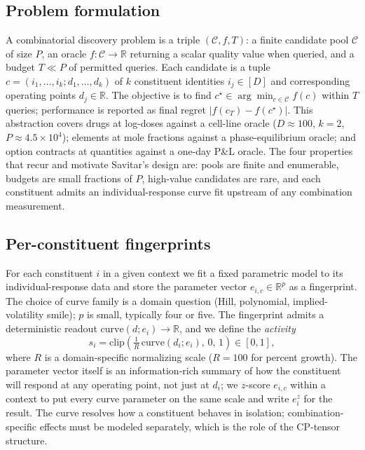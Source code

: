 \documentclass{article}
\begin{document}
\subsection{Problem formulation}

A combinatorial discovery problem is a triple $(\mathcal{C}, f, T)$: a finite
candidate pool $\mathcal{C}$ of size $P$, an oracle $f: \mathcal{C} \to
\mathbb{R}$ returning a scalar quality value when queried, and a budget
$T \ll P$ of permitted queries. Each candidate is a tuple
$c = (i_1,\ldots,i_k; d_1,\ldots,d_k)$ of $k$ constituent identities
$i_j \in [D]$ and corresponding operating points $d_j \in \mathbb{R}$. The
objective is to find $c^\star \in \arg\min_{c \in \mathcal{C}} f(c)$ within
$T$ queries; performance is reported as final regret
$|f(c_T) - f(c^\star)|$. This abstraction covers drugs at log-doses against a
cell-line oracle ($D \approx 100$, $k = 2$, $P \approx 4.5 \times 10^4$);
elements at mole fractions against a phase-equilibrium oracle; and option
contracts at quantities against a one-day P\&L oracle. The four properties
that recur and motivate Savitar's design are: pools are finite and
enumerable, budgets are small fractions of $P$, high-value candidates are
rare, and each constituent admits an individual-response curve fit upstream
of any combination measurement.

\subsection{Per-constituent fingerprints}

For each constituent $i$ in a given context we fit a fixed parametric model
to its individual-response data and store the parameter vector
$e_{i,c} \in \mathbb{R}^p$ as a fingerprint. The choice of curve family is a
domain question (Hill, polynomial, implied-volatility smile); $p$ is small,
typically four or five. The fingerprint admits a deterministic readout
$\mathrm{curve}(d; e_i) \to \mathbb{R}$, and we define the \emph{activity}
\begin{equation}
s_i = \mathrm{clip}\!\left(\tfrac{1}{R}\,\mathrm{curve}(d_i; e_i),\, 0,\, 1\right) \in [0,1],
\end{equation}
where $R$ is a domain-specific normalizing scale ($R = 100$ for percent
growth). The parameter vector itself is an information-rich summary of how the
constituent will respond at any operating point, not just at $d_i$; we
$z$-score $e_{i,c}$ within a context to put every curve parameter on the same
scale and write $e_i^z$ for the result. The curve resolves how a constituent
behaves in isolation; combination-specific effects must be modeled
separately, which is the role of the CP-tensor structure.
\end{document}
